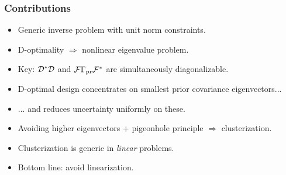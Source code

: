 \documentclass{beamer}
\begin{document}
\begin{frame}
  \frametitle{Contributions}
  \begin{itemize}
  \item <1-> Generic inverse problem with unit norm constraints.
  \item <2-> D-optimality \( \Longrightarrow \) nonlinear eigenvalue problem.%
  \item <3-> Key: $\mathcal{D}^*\mathcal{D}$ and \(\mathcal{F} \Gamma_{\textup{pr}}\mathcal{F}^*\) are
    simultaneously diagonalizable.
  \item <4-> D-optimal design concentrates on smallest prior covariance eigenvectors...
  \item <5-> ... and reduces uncertainty uniformly on these.
  \item <6-> Avoiding higher eigenvectors + pigeonhole principle
    $\Rightarrow$ clusterization.
  \item <7-> Clusterization is generic in \emph{linear} problems.
  \item <8-> Bottom line: avoid linearization. %
  \end{itemize}
\end{frame}
\end{document}
